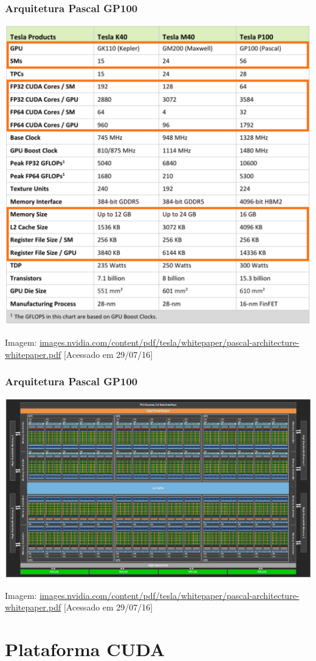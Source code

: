 \documentclass[10pt, compress]{beamer}
\begin{document}
\begin{frame}
    \frametitle{Arquitetura Pascal GP100}
    \centering
    \includegraphics[width=.7\textwidth]{gp100_stats_highlight}
    \vfill

    \tiny{Imagem: \url{images.nvidia.com/content/pdf/tesla/whitepaper/pascal-architecture-whitepaper.pdf} [Acessado em 29/07/16]}
\end{frame}

\begin{frame}
    \frametitle{Arquitetura Pascal GP100}
    \centering
    \includegraphics[width=.95\textwidth]{gp100_diagram}
    \vfill

    \tiny{Imagem: \url{images.nvidia.com/content/pdf/tesla/whitepaper/pascal-architecture-whitepaper.pdf} [Acessado em 29/07/16]}
\end{frame}

\section{Plataforma CUDA}
\end{document}
